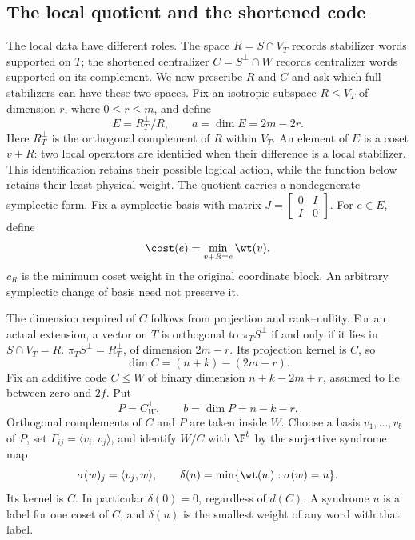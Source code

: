 \subsection{The local quotient and the shortened code}

The local data have different roles. The space \(R=S\cap V_T\)
records stabilizer words supported on \(T\); the shortened centralizer
\(C=S^\perp\cap W\) records centralizer words supported on its
complement. We now prescribe \(R\) and \(C\) and ask which full
stabilizers can have these two spaces.
Fix an isotropic subspace \(R\leq V_T\) of dimension \(r\), where
\(0\leq r\leq m\), and define
\[
 E=R_T^\perp/R,\qquad a=\dim E=2m-2r.
\]
Here \(R_T^\perp\) is the orthogonal complement of \(R\) within
\(V_T\).
An element of \(E\) is a coset \(v+R\): two local operators are
identified when their difference is a local stabilizer. This identification
retains their possible logical action, while the function below retains
their least physical weight.
The quotient carries a nondegenerate symplectic form. Fix a symplectic basis with matrix
\(J=\left[\begin{smallmatrix}0&I\\I&0\end{smallmatrix}\right]\).
For \(e\in E\), define
\[
 \cost(e)=\min_{v+R=e}\wt(v).
\]
\(c_R\) is the minimum coset weight in the original coordinate block.
An arbitrary
symplectic change of basis need not preserve it.

The dimension required of \(C\) follows from projection and rank--nullity.
For an actual extension, a vector on \(T\) is orthogonal to
\(\pi_T S^\perp\) if and only if it lies in \(S\cap V_T=R\).
\(\pi_T S^\perp=R_T^\perp\), of dimension \(2m-r\).
Its projection kernel is \(C\), so
\begin{equation}\label{eq:dimC}
 \dim C=(n+k)-(2m-r).
\end{equation}
Fix an additive code \(C\leq W\) of binary dimension
\(n+k-2m+r\), assumed to lie between zero and \(2f\). Put
\[
 P=C^\perp_W,\qquad b=\dim P=n-k-r.
\]
Orthogonal complements of \(C\) and \(P\) are taken inside \(W\).
Choose a basis \(v_1,\ldots,v_b\) of \(P\), set
\(\Gamma_{ij}=\langle v_i,v_j\rangle\), and identify \(W/C\)
with \(\F^b\) by the surjective syndrome map
\[
 \sigma(w)_j=\langle v_j,w\rangle,\qquad
 \delta(u)=\min\{\wt(w):\sigma(w)=u\}.
\]
Its kernel is \(C\). In particular \(\delta(0)=0\), regardless of
\(d(C)\). A syndrome \(u\) is a label for one coset of
\(C\), and \(\delta(u)\) is the smallest weight of any word with
that label.

